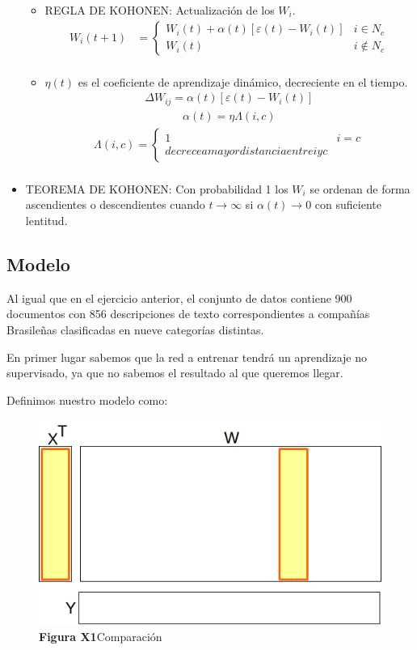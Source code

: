 \begin{itemize}
\begin{itemize}
			\item REGLA DE KOHONEN: Actualización de los $W_{i}$.
					\begin{align*}
					 W_{i}(t+1) &=  \begin{cases}
										W_{i}(t) + \alpha(t) [ \varepsilon(t) - W_{i}(t) ] & i \in N_{c} \\
										W_{i}(t)                                           & i \not \in N_{c}  
									\end{cases} \\
					\end{align*}
			\item $\eta(t)$ es el coeficiente de aprendizaje dinámico, decreciente en el tiempo.
				\begin{align*}
					\Delta W_{ij} = \alpha(t) [ \varepsilon(t) - W_{i}(t) ]
				\end{align*}
				\begin{align*}
					\alpha(t) = \eta \Lambda(i,c)
				\end{align*}
				\begin{align*}
					\Lambda(i,c) = \begin{cases}
										1 & i = c \\
										decrece a mayor distancia entre i y c 
									\end{cases} \\
				\end{align*}
		\end{itemize}
	\item TEOREMA DE KOHONEN: Con probabilidad 1 los $W_{i}$ se ordenan de forma ascendientes o descendientes cuando $t \to
		\infty$ si $\alpha(t) \to 0$ con suficiente lentitud.
\end{itemize}

\subsection{Modelo}
Al igual que en el ejercicio anterior, el conjunto de datos contiene 900 documentos con 856 descripciones de texto 
correspondientes a compañías Brasileñas clasificadas en nueve categorías distintas.

En primer lugar sabemos que la red a entrenar tendrá un aprendizaje no supervisado, ya que no sabemos el resultado al que
queremos llegar.

Definimos nuestro modelo como:

\begin{figure}[ht!]
	\centering
	\includegraphics[width=0.7\linewidth]{img/parte2-comparacion.jpg}
	\caption{\textbf{Figura X1}Comparación}
\end{figure}

